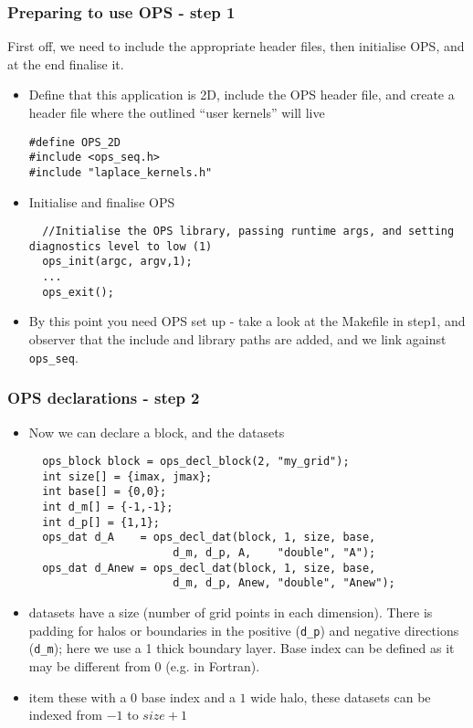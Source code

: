 \documentclass{beamer}
\begin{document}
\begin{frame}[fragile]
\frametitle{Preparing to use OPS - step 1}
First off, we need to include the appropriate header files, then initialise OPS, and at the end finalise it.
\begin{itemize}
\item Define that this application is 2D, include the OPS header file, and create a header file where the outlined ``user kernels'' will live
\begin{lstlisting}
#define OPS_2D
#include <ops_seq.h>
#include "laplace_kernels.h"
\end{lstlisting}
\item Initialise and finalise OPS
\begin{lstlisting}
  //Initialise the OPS library, passing runtime args, and setting diagnostics level to low (1)
  ops_init(argc, argv,1);
  ...
  ops_exit();
\end{lstlisting}
\item By this point you need OPS set up - take a look at the Makefile in step1, and observer that the include and library paths are added, and we link against \texttt{ops\_seq}.
\end{itemize}
\end{frame}


\begin{frame}[fragile]
\frametitle{OPS declarations - step 2}
\begin{itemize}
\item Now we can declare a block, and the datasets
\begin{lstlisting}
  ops_block block = ops_decl_block(2, "my_grid");
  int size[] = {imax, jmax};
  int base[] = {0,0};
  int d_m[] = {-1,-1};
  int d_p[] = {1,1};
  ops_dat d_A    = ops_decl_dat(block, 1, size, base,
                      d_m, d_p, A,    "double", "A");
  ops_dat d_Anew = ops_decl_dat(block, 1, size, base,
                      d_m, d_p, Anew, "double", "Anew");
  \end{lstlisting}
  \item datasets have a size (number of grid points in each dimension). There is padding for halos or boundaries in the positive (\texttt{d\_p}) and negative directions (\texttt{d\_m}); here we use a 1 thick boundary layer. Base index can be defined as it may be different from 0 (e.g. in Fortran). 
  \item item these with a $0$ base index and a $1$ wide halo, these datasets can be indexed from $-1$ to $size+1$
\end{itemize}
\end{frame}
\end{document}
